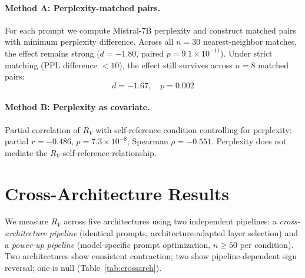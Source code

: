 \documentclass{article}
\newcommand{\RV}{R_V}
\newcommand{\dcohen}{d}
\begin{document}

\paragraph{Method A: Perplexity-matched pairs.}
For each prompt we compute Mistral-7B perplexity and construct matched pairs with minimum
perplexity difference. Across all $n = 30$ nearest-neighbor matches, the effect remains strong
($\dcohen = -1.80$, paired $p = 9.1 \times 10^{-11}$).
Under strict matching (PPL difference $< 10$), the effect still survives across $n = 8$ matched pairs:
\begin{equation}
\dcohen = -1.67, \quad p = 0.002
\label{eq:ppl}
\end{equation}

\paragraph{Method B: Perplexity as covariate.}
Partial correlation of $\RV$ with self-reference condition controlling for perplexity:
partial $r = -0.486$, $p = 7.3 \times 10^{-8}$; Spearman $\rho = -0.551$.
Perplexity does not mediate the $\RV$-self-reference relationship.


\section{Cross-Architecture Results}
\label{sec:crossarch}

We measure $\RV$ across five architectures using two independent pipelines: a
\emph{cross-architecture pipeline} (identical prompts, architecture-adapted layer selection)
and a \emph{power-up pipeline} (model-specific prompt optimization, $n \geq 50$ per condition).
Two architectures show consistent contraction; two show pipeline-dependent sign reversal;
one is null (Table~\ref{tab:crossarch}).
\end{document}
